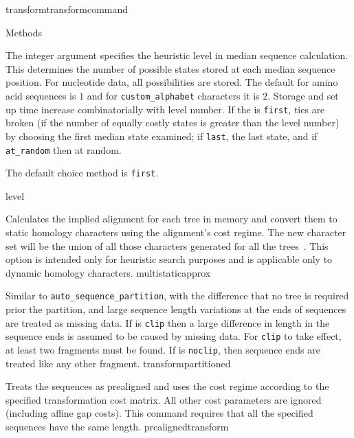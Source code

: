 \begin{command}{transform}{transformcommand}
\begin{arguments}
\begin{argumentgroup}{Methods}
          {The integer argument specifies the heuristic level in median sequence calculation.  
            This determines the number of possible states stored at each median sequence position.  
            For nucleotide data, all possibilities are stored.  The default for amino acid sequences is $1$
            and for \texttt{custom\_alphabet} characters it is $2$.  Storage and set up time increase combinatorially with
            level number. 
            If the \poylident is \texttt{first}, ties are broken (if the number of equally costly states is greater than the level number)
            by choosing the first median state examined; if \texttt{last}, the last state, and if \texttt{at\_random} then at random.
            
            The default choice method is \texttt{first}.
	}
          {level}
          
            {Calculates the implied alignment for each tree in memory
            and convert them to static homology characters using the alignment's
            cost regime. The new character set will be the union of all those
            characters generated for all the trees~\cite{wheeler1995a}. This option is intended only
            for heuristic search purposes and is applicable only to dynamic homology characters.}
            {multistaticapprox}



            {Similar to \texttt{auto\_sequence\_partition}, with the difference that no tree is
            required prior the partition, and large sequence length variations
            at the ends of sequences are treated as missing data. If \poylident is \texttt{clip} then
            a large difference in length in the sequence ends is assumed to be caused by
            missing data. For \texttt{clip} to take effect, at least two fragments must
            be found. If \poylident is \texttt{noclip}, then sequence ends are treated like
            any other fragment.}
            {transformpartitioned}
            
            
                {Treats the sequences as prealigned and uses the
                cost regime according to the specified transformation cost
                matrix. All other cost parameters are ignored (including affine
                gap costs). This command requires that all the specified sequences have the same length.}
                {prealignedtransform}
            

\end{argumentgroup}
\end{arguments}
\end{command}
